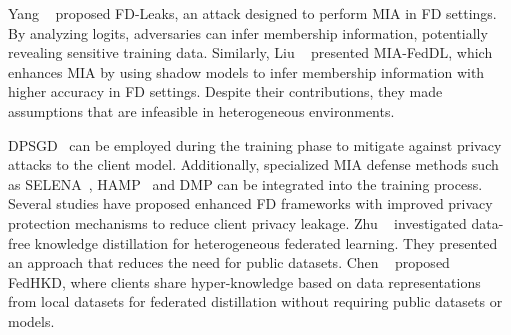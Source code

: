 Yang \etal~\cite{yang2022fd} proposed FD-Leaks, an attack designed to perform MIA in FD settings.
By analyzing logits, adversaries can infer membership information, potentially revealing sensitive training data.
Similarly, Liu \etal~\cite{liu2023mia} presented MIA-FedDL, which enhances MIA by using shadow models to infer membership information with higher accuracy in FD settings.
Despite their contributions, they made assumptions that are infeasible in heterogeneous environments.
\fi

DPSGD~\cite{abadi2016deep} can be employed during the training phase to mitigate against privacy attacks to the client model. 
Additionally, specialized MIA defense methods such as SELENA~\cite{tang2022mitigating}, HAMP~\cite{chen2023overconfidence} and DMP\cite{shejwalkar2021membership} can be integrated into the training process.
Several studies have proposed enhanced FD frameworks with improved privacy protection mechanisms to reduce client privacy leakage.
Zhu \etal~\cite{zhu2021data} investigated data-free knowledge distillation for heterogeneous federated learning.
They presented an approach that reduces the need for public datasets.
Chen \etal~\cite{chen2023best} proposed FedHKD, where clients share hyper-knowledge based on data representations from local datasets for federated distillation without requiring public datasets or models.

